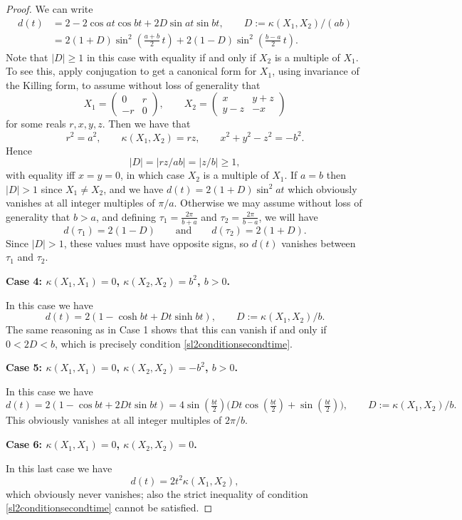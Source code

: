 \documentclass[oneside, 11pt]{amsart}
\numberwithin{equation}{section}
\newcommand{\bim}{\kappa}
\newcommand{\simpkill}{\kappa}
\newcommand{\mattyone}{X_1}
\newcommand{\mattytwo}{X_2}
\begin{document}
\begin{proof}
    We can write
    \begin{align*}
        d(t) &= 2-2\cos{a t}\cos{bt} +2 D \sin{at}\sin{bt}, \qquad D:=\simpkill(\mattyone,\mattytwo)/(ab) \\
        &= 
        2(1+D) \sin^2{\left( \frac{a+ b}{2} \, t\right)} + 2(1-D)\sin^2{\left( \frac{ b -a}{2} \, t\right)}.
    \end{align*}
    Note that $\lvert D\rvert\ge 1$ in this case with equality if and only if $\mattytwo$ is a multiple of $\mattyone$. To see this, apply conjugation to get a canonical form for $\mattyone$, using invariance of the Killing form, to assume without loss of generality that
    $$ \mattyone = \left( \begin{matrix} 0 & r \\ 
    -r & 0 \end{matrix}\right), \qquad \mattytwo = \left(\begin{matrix} x & y+z \\ y-z & -x\end{matrix}\right)$$
    for some reals $r,x,y,z$. 
    Then we have that 
    $$ r^2=a^2, \qquad \simpkill(\mattyone,\mattytwo) = rz, \qquad 
    x^2+y^2-z^2= -b^2.$$
    Hence $$\lvert D\rvert = \lvert rz/ab\rvert = \lvert z/b\rvert \ge 1,$$
    with equality iff $x=y=0$, in which case $\mattytwo$ is a multiple of $\mattyone$.
If $a=b$ then $\lvert D\rvert > 1$ since $\mattyone\ne \mattytwo$, and we have $d(t) = 2(1+D) \sin^2{at}$ which obviously vanishes at all integer multiples of $\pi/a$. 
Otherwise we may assume without loss of generality that $b>a$, and  defining $\tau_1 = \frac{2\pi}{b+a}$ and $\tau_2 = \frac{2\pi}{b-a}$, we will have 
    $$d(\tau_1) = 2(1-D)  \qquad \text{and}\qquad d(\tau_2) = 2(1+D).$$
    Since $\lvert D\rvert > 1$, these values must have opposite signs,
    so $d(t)$ vanishes between $\tau_1$ and $\tau_2$. 
 

\textbf{Case 4: $\simpkill(\mattyone,\mattyone)=0$, $\simpkill(\mattytwo,\mattytwo)=b^2$, $b>0$.}

In this case we have 
$$ d(t) = 2(1-\cosh{bt} + Dt \sinh{bt}), \qquad D:= \bim(\mattyone,\mattytwo)/b.$$
The same reasoning as in Case 1 shows that this can vanish if and only if $0<2D<b$, which is precisely condition \eqref{sl2conditionsecondtime}.

\textbf{Case 5: $\simpkill(\mattyone,\mattyone)=0$, $\simpkill(\mattytwo,\mattytwo)=-b^2$, $b>0$.}

In this case we have 
$$d(t) = 2(1-\cos{bt} + 2Dt\sin{bt}) = 4\sin{(\tfrac{bt}{2})} \big( Dt \cos{(\tfrac{bt}{2})} + \sin{(\tfrac{bt}{2})}\big), \qquad D:= \bim(\mattyone,\mattytwo)/b.$$
This obviously vanishes at all integer multiples of $2\pi/b$. 

\textbf{Case 6: $\simpkill(\mattyone,\mattyone)=0$, $\simpkill(\mattytwo,\mattytwo)=0$.}

In this last case we have 
$$d(t) = 2t^2 \bim(\mattyone,\mattytwo),$$
which obviously never vanishes; also the strict inequality of condition \eqref{sl2conditionsecondtime} cannot be satisfied.
\end{proof}
\end{document}
